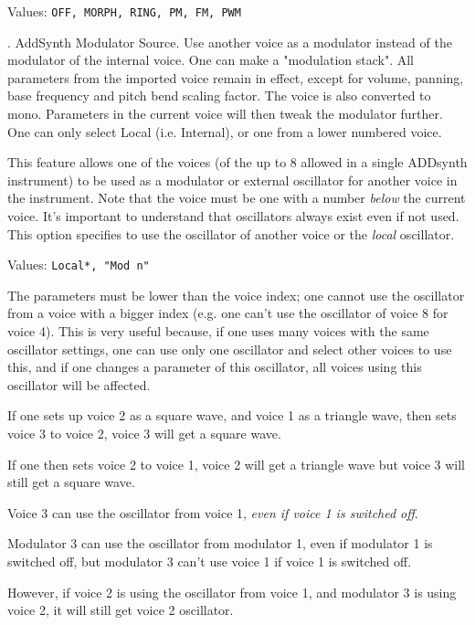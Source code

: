    Values: \texttt{OFF, MORPH, RING, PM, FM, PWM}

   .
   AddSynth Modulator Source.
   Use another voice as a modulator instead of the modulator of the internal
   voice. One can make a "modulation stack". All parameters from the imported
   voice remain in effect, except for volume, panning, base frequency and pitch
   bend scaling factor. The voice is also converted to mono. Parameters in the
   current voice will then tweak the modulator further.  One can only select
   Local (i.e. Internal), or one from a lower numbered voice.

   This feature allows one of the voices (of the up to 8 allowed in a single
   ADDsynth instrument) to be used as a modulator or external oscillator for
   another voice in the instrument.
   Note that the voice must be one with a number \textsl{below} the current
   voice.
   It's important to understand that oscillators always exist even if not
   used.
   This option specifies to use the oscillator of another voice or
   the \textsl{local} oscillator.

   Values: \texttt{Local*, "Mod n"}

   The parameters must be lower than the voice index; one cannot use the
   oscillator from a voice with a bigger index (e.g. one can't use the
   oscillator of voice 8 for voice 4). This is very useful because, if
   one uses many voices with the same oscillator settings, one can use only
   one oscillator and select other voices to use this, and if one changes a
   parameter of this oscillator, all voices using this oscillator will be
   affected.

   If one sets up voice 2 as a square wave, and voice 1 as a triangle wave,
   then sets voice 3 to voice 2, voice 3 will get a square wave.

   If one then sets voice 2 to voice 1, voice 2 will get a triangle wave but
   voice 3 will still get a square wave.

   Voice 3 can use the oscillator from voice 1,
   \textsl{even if voice 1 is switched off}.

   Modulator 3 can use the oscillator from modulator 1, even if modulator 1 is
   switched off, but modulator 3 can't use voice 1 if voice 1 is
   switched off.

   However, if voice 2 is using the oscillator from voice 1, and modulator 3 is
   using voice 2, it will still get voice 2 oscillator.


